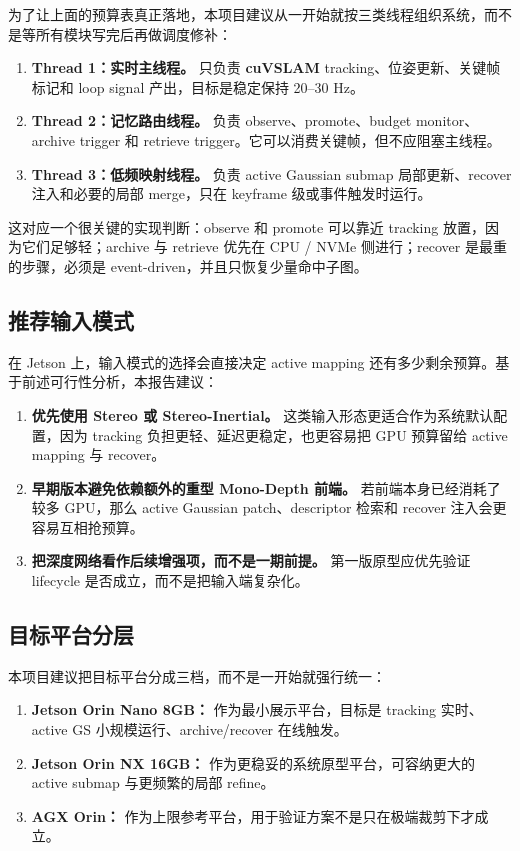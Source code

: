 \documentclass[12pt]{article}
\newcommand{\cuvslam}{\textbf{cuVSLAM}}
\begin{document}
为了让上面的预算表真正落地，本项目建议从一开始就按三类线程组织系统，而不是等所有模块写完后再做调度修补：
\begin{enumerate}
  \item \textbf{Thread 1：实时主线程。} 只负责 \cuvslam{} tracking、位姿更新、关键帧标记和 loop signal 产出，目标是稳定保持 20--30 Hz。
  \item \textbf{Thread 2：记忆路由线程。} 负责 observe、promote、budget monitor、archive trigger 和 retrieve trigger。它可以消费关键帧，但不应阻塞主线程。
  \item \textbf{Thread 3：低频映射线程。} 负责 active Gaussian submap 局部更新、recover 注入和必要的局部 merge，只在 keyframe 级或事件触发时运行。
\end{enumerate}

这对应一个很关键的实现判断：observe 和 promote 可以靠近 tracking 放置，因为它们足够轻；archive 与 retrieve 优先在 CPU / NVMe 侧进行；recover 是最重的步骤，必须是 event-driven，并且只恢复少量命中子图。

\subsection{推荐输入模式}

在 Jetson 上，输入模式的选择会直接决定 active mapping 还有多少剩余预算。基于前述可行性分析，本报告建议：
\begin{enumerate}
  \item \textbf{优先使用 Stereo 或 Stereo-Inertial。} 这类输入形态更适合作为系统默认配置，因为 tracking 负担更轻、延迟更稳定，也更容易把 GPU 预算留给 active mapping 与 recover。
  \item \textbf{早期版本避免依赖额外的重型 Mono-Depth 前端。} 若前端本身已经消耗了较多 GPU，那么 active Gaussian patch、descriptor 检索和 recover 注入会更容易互相抢预算。
  \item \textbf{把深度网络看作后续增强项，而不是一期前提。} 第一版原型应优先验证 lifecycle 是否成立，而不是把输入端复杂化。
\end{enumerate}

\subsection{目标平台分层}

本项目建议把目标平台分成三档，而不是一开始就强行统一：
\begin{enumerate}
  \item \textbf{Jetson Orin Nano 8GB：} 作为最小展示平台，目标是 tracking 实时、active GS 小规模运行、archive/recover 在线触发。
  \item \textbf{Jetson Orin NX 16GB：} 作为更稳妥的系统原型平台，可容纳更大的 active submap 与更频繁的局部 refine。
  \item \textbf{AGX Orin：} 作为上限参考平台，用于验证方案不是只在极端裁剪下才成立。
\end{enumerate}
\end{document}
